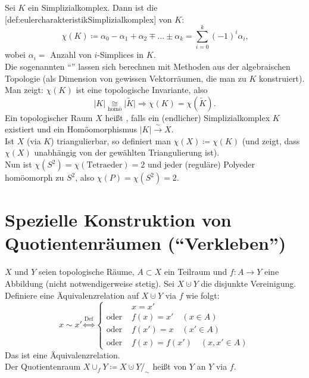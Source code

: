 \begin{definition}
  Sei $ K $ ein Simplizialkomplex. Dann ist die [def:eulercharakteristikSimplizialkomplex] von $ K $:
  \begin{equation*}
    \chi(K) \coloneqq \alpha_0-\alpha_1+\alpha_2 \mp \dots \pm \alpha_k = \sum_{i = 0}^k (-1)^i\alpha_i\text{,}
  \end{equation*}
  wobei $ \alpha_i = $ Anzahl von $ i $-Simplices in $ K $. \\
  Die sogenannten ``''\label{def:bettiZahlen} lassen sich berechnen mit Methoden aus der algebraischen Topologie (als Dimension von gewissen Vektorräumen, die man zu $ K $ konstruiert). \\
  Man zeigt: $ \chi(K) $ ist eine topologische Invariante, also 
  \begin{equation*}
    \vert K \vert \underset{\text{homö}}{\cong} \vert \widetilde{K} \vert \Rightarrow \chi(K) = \chi(\widetilde{K})\text{.}
  \end{equation*}
  Ein topologischer Raum $ X $ heißt \label{def:triangulierbar}, falls ein (endlicher) Simplizialkomplex $ K $ existiert und ein Homöomorphismus $ \vert K \vert \overset{\sim}{\to} X $. \\
  Ist $ X $ (via $ K $) triangulierbar, so definiert man $ \chi(X) \coloneqq \chi(K) $ (und zeigt, dass $ \chi(X) $ unabhängig von der gewählten Triangulierung ist). \\
  Nun ist $ \chi(S^2) = \chi(\text{Tetraeder}) = 2 $ und jeder (reguläre) Polyeder homöomorph zu $ S^2 $, also $ \chi(P) = \chi(S^2) = 2 $.
\end{definition}


\section{Spezielle Konstruktion von Quotientenräumen (``Verkleben'')}

\begin{definition}[Verklebung]
  $ X $ und $ Y $ seien topologische Räume, $ A \subset X $ ein Teilraum und $ f: A \to Y $ eine Abbildung (nicht notwendigerweise stetig). Sei $ X \cupdot Y $ die disjunkte Vereinigung. Definiere eine Äquivalenzrelation auf $ X \cupdot Y $ via $ f $ wie folgt:
  \begin{equation*}
    x \sim x' \overset{\text{Def}}{\Leftrightarrow} \begin{cases}
      &x = x' \\
      \text{oder } &f(x) = x' \quad (x \in A) \\
      \text{oder } &f(x') = x \quad (x' \in A) \\
      \text{oder } &f(x) = f(x') \quad (x, x' \in A)
    \end{cases}
  \end{equation*}
  Das ist eine Äquivalenzrelation. \\
  Der Quotientenraum $ X \cup_f Y \coloneqq X \cupdot Y /_\sim $ heißt \label{def:verklebung} von $ Y $ an $ Y $ via $ f $.
\end{definition}


